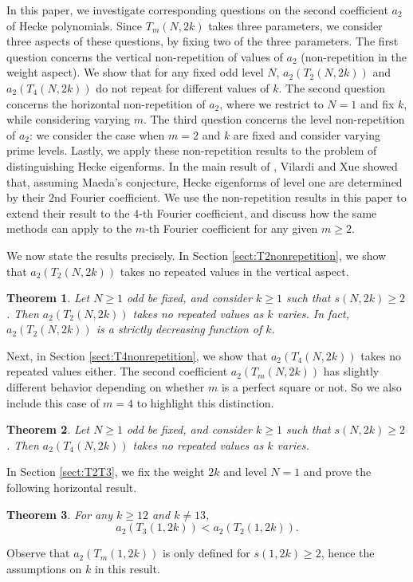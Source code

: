 \documentclass[11pt,letterpaper,reqno]{amsart}
\numberwithin{figure}{section}
\numberwithin{table}{section}
\theoremstyle{definition}
\theoremstyle{plain}
\newtheorem{theorem}{Theorem}[section]
\theoremstyle{definition}
\theoremstyle{definition}
\theoremstyle{remark}
\numberwithin{equation}{section}
\begin{document}
In this paper, we investigate corresponding questions on the second coefficient $a_2$ of Hecke polynomials. Since $T_m(N,2k)$ takes three parameters, we consider three aspects of these questions, by fixing two of the three parameters. The first question concerns the vertical non-repetition of values of $a_2$ (non-repetition in the weight aspect). We show that for any fixed odd level $N$, $a_2(T_2(N, 2k))$ and $a_2(T_4(N, 2k))$ do not repeat for different values of $k$. 
The second question concerns the horizontal non-repetition of $a_2$, where we restrict to $N = 1$ and fix $k$, while considering varying $m$. The third question concerns the level non-repetition of $a_2$: 
we consider
the case when $m=2$ and $k$ are fixed and consider varying prime levels. 
Lastly, we apply these non-repetition results to the problem of distinguishing Hecke eigenforms. In the main result of \cite{Vilardi2018}, Vilardi and Xue showed that, assuming Maeda's conjecture, Hecke eigenforms of level one are determined by their $2$nd Fourier coefficient. We use the non-repetition results in this paper to extend their result to the $4$-th Fourier coefficient, and discuss how the same methods can apply to the $m$-th Fourier coefficient for any given $m \ge 2$. 

We now state the results precisely. In Section \ref{sect:T2nonrepetition}, we show that $a_2(T_2(N, 2k))$ takes no repeated values in the vertical aspect.
\begin{theorem}\label{theorem:main}
    Let $N \ge 1$ odd be fixed, and consider $k \geq 1$ such that $s(N,2k) \ge 2$. Then 
    $a_2(T_2(N, 2k))$
    takes no repeated values as $k$ varies.
    In fact, $a_2(T_2(N, 2k))$ is a strictly decreasing function of $k$.
\end{theorem}

Next, in Section \ref{sect:T4nonrepetition}, we show that $a_2(T_4(N,2k))$ takes no repeated values either. The second coefficient $a_2(T_m(N,2k))$ has slightly different behavior depending on whether $m$ is a perfect square or not. So we also include this case of $m=4$ to highlight this distinction.
\begin{theorem}\label{theorem:main4}
    Let $N \ge 1$ odd be fixed, and consider $k \geq 1$ such that $s(N,2k) \ge 2$. Then 
    $a_2(T_4(N, 2k))$
    takes no repeated values as $k$ varies.
\end{theorem}

In Section \ref{sect:T2T3}, we fix the weight $2k$  and level $N = 1$ and prove the following horizontal result.
\begin{theorem}\label{theorem:T2T3notequal}
    For any $k\geq 12$ and $k\neq 13$,
    \begin{equation}
        a_2(T_3(1,2k))< a_2(T_2(1,2k)).
    \end{equation}
\end{theorem}
Observe that $a_2(T_m(1, 2k))$ is only defined for $s(1,2k)\geq 2$, hence the assumptions on $k$ in this result. 
\end{document}
